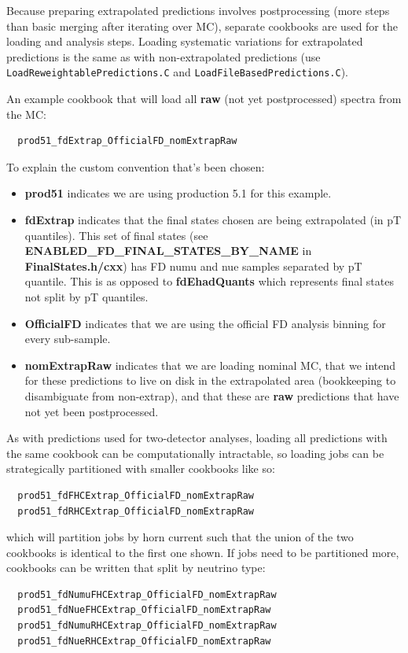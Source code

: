 \documentclass{article}
\begin{document}
Because preparing extrapolated predictions involves postprocessing (more steps than basic merging after iterating over MC), separate cookbooks are used for the loading and analysis steps. Loading systematic variations for extrapolated predictions is the same as with non-extrapolated predictions (use \texttt{Load\-Reweightable\-Predictions\-.C} and \texttt{Load\-File\-Based\-Predictions\-.C}).

An example cookbook that will load all \textbf{raw} (not yet postprocessed) spectra from the MC:
\begin{verbatim}
  prod51_fdExtrap_OfficialFD_nomExtrapRaw
\end{verbatim}

To explain the custom convention that's been chosen:
\begin{itemize}
  \item \textbf{prod51} indicates we are using production 5.1 for this example.
  \item \textbf{fdExtrap} indicates that the final states chosen are being extrapolated (in pT quantiles). This set of final states (see \textbf{ENABLED\_FD\_FINAL\_STATES\_BY\_NAME} in \textbf{FinalStates.h/cxx}) has FD numu and nue samples separated by pT quantile. This is as opposed to \textbf{fdEhadQuants} which represents final states not split by pT quantiles.
  \item \textbf{OfficialFD} indicates that we are using the official FD analysis binning for every sub-sample.
  \item \textbf{nomExtrapRaw} indicates that we are loading nominal MC, that we intend for these predictions to live on disk in the extrapolated area (bookkeeping to disambiguate from non-extrap), and that these are \textbf{raw} predictions that have not yet been postprocessed.
\end{itemize}

As with predictions used for two-detector analyses, loading all predictions with the same cookbook can be computationally intractable, so loading jobs can be strategically partitioned with smaller cookbooks like so:
\begin{verbatim}
  prod51_fdFHCExtrap_OfficialFD_nomExtrapRaw
  prod51_fdRHCExtrap_OfficialFD_nomExtrapRaw
\end{verbatim}
which will partition jobs by horn current such that the union of the two cookbooks is identical to the first one shown. If jobs need to be partitioned more, cookbooks can be written that split by neutrino type:
\begin{verbatim}
  prod51_fdNumuFHCExtrap_OfficialFD_nomExtrapRaw
  prod51_fdNueFHCExtrap_OfficialFD_nomExtrapRaw
  prod51_fdNumuRHCExtrap_OfficialFD_nomExtrapRaw
  prod51_fdNueRHCExtrap_OfficialFD_nomExtrapRaw
\end{verbatim}
\end{document}

